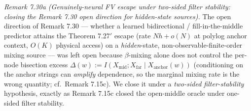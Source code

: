 \documentclass[
]{article}
\begin{document}
\emph{Remark 7.30a (Genuinely-neural FV escape under two-sided filter stability:
closing the Remark 7.30 open direction for hidden-state sources).} The open direction
of Remark 7.30 --- whether a learned bidirectional / fill-in-the-middle predictor
attains the Theorem 7.27$'$ escape (rate $Nh+o(N)$ at polylog anchor context, $O(K)$
physical access) on a \emph{hidden}-state, non-observable-finite-order mixing source
--- was left open because $\beta$-mixing alone does not control the per-node bisection
excess $\Delta(w):=I(X_{\mathrm{mid}};X_{\mathrm{far}}\mid X_{\mathrm{anchor}}(w))$
(conditioning on the anchor strings can \emph{amplify} dependence, so the marginal
mixing rate is the wrong quantity; cf.\ Remark 7.15c). We close it under a
\emph{two-sided filter-stability} hypothesis, exactly as Remark 7.15c closed the
open-middle oracle under one-sided filter stability.
\end{document}
